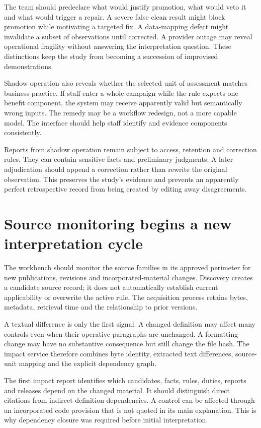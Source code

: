 \documentclass[12pt,a4paper,oneside,openany]{book}
\begin{document}
The team should predeclare what would justify promotion, what would veto it and
what would trigger a repair. A severe false clean result might block promotion
while motivating a targeted fix. A data-mapping defect might invalidate a subset
of observations until corrected. A provider outage may reveal operational
fragility without answering the interpretation question. These distinctions keep
the study from becoming a succession of improvised demonstrations.

Shadow operation also reveals whether the selected unit of assessment matches
business practice. If staff enter a whole campaign while the rule expects one
benefit component, the system may receive apparently valid but semantically wrong
inputs. The remedy may be a workflow redesign, not a more capable model. The
interface should help staff identify and evidence components consistently.

Reports from shadow operation remain subject to access, retention and correction
rules. They can contain sensitive facts and preliminary judgments. A later
adjudication should append a correction rather than rewrite the original
observation. This preserves the study's evidence and prevents an apparently
perfect retrospective record from being created by editing away disagreements.

\section{Source monitoring begins a new interpretation cycle}
\label{merge:M10:04}


The workbench should monitor the source families in its approved perimeter for
new publications, revisions and incorporated-material changes. Discovery creates
a candidate source record; it does not automatically establish current
applicability or overwrite the active rule. The acquisition process retains bytes,
metadata, retrieval time and the relationship to prior versions.

A textual difference is only the first signal. A changed definition may affect
many controls even when their operative paragraphs are unchanged. A formatting
change may have no substantive consequence but still change the file hash. The
impact service therefore combines byte identity, extracted text differences,
source-unit mapping and the explicit dependency graph.

The first impact report identifies which candidates, facts, rules, duties,
reports and releases depend on the changed material. It should distinguish direct
citations from indirect definition dependencies. A control can be affected through
an incorporated code provision that is not quoted in its main explanation. This
is why dependency closure was required before initial interpretation.
\end{document}
